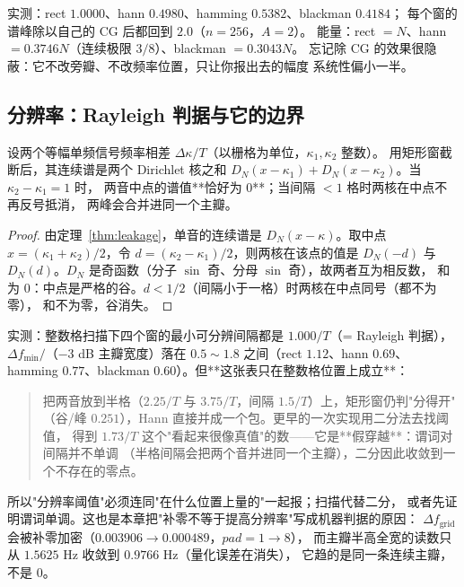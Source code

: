 实测：rect $1.0000$、hann $0.4980$、hamming $0.5382$、blackman $0.4184$；
每个窗的谱峰除以自己的 $\mathrm{CG}$ 后都回到 $2.0$（$n=256$，$A=2$）。
能量：rect $=N$、hann $=0.3746N$（连续极限 $3/8$）、blackman $=0.3043N$。
忘记除 $\mathrm{CG}$ 的效果很隐蔽：它不改旁瓣、不改频率位置，只让你报出去的幅度
系统性偏小一半。

\subsection{分辨率：Rayleigh 判据与它的边界}

\begin{theorem}
\label{thm:rayleigh}
设两个等幅单频信号频率相差 $\Delta\kappa/T$（以栅格为单位，$\kappa_1,\kappa_2$ 整数）。
用矩形窗截断后，其连续谱是两个 Dirichlet 核之和
$D_N(x-\kappa_1)+D_N(x-\kappa_2)$。当 $\kappa_2-\kappa_1=1$ 时，
两音中点的谱值**恰好为 $0$**；当间隔 $<1$ 格时两核在中点不再反号抵消，
两峰会合并进同一个主瓣。
\end{theorem}

\begin{proof}
由定理~\ref{thm:leakage}，单音的连续谱是 $D_N(x-\kappa)$。取中点
$x=(\kappa_1+\kappa_2)/2$，令 $d=(\kappa_2-\kappa_1)/2$，则两核在该点的值是
$D_N(-d)$ 与 $D_N(d)$。$D_N$ 是奇函数（分子 $\sin$ 奇、分母 $\sin$ 奇），故两者互为相反数，
和为 $0$：中点是严格的谷。$d<1/2$（间隔小于一格）时两核在中点同号（都不为零），
和不为零，谷消失。
\end{proof}

实测：整数格扫描下四个窗的最小可分辨间隔都是 $1.000/T$（= Rayleigh 判据），
$\Delta f_{\min}/$（$-3$ dB 主瓣宽度）落在 $0.5\sim1.8$ 之间（rect $1.12$、hann $0.69$、
hamming $0.77$、blackman $0.60$）。但**这张表只在整数格位置上成立**：

\begin{quote}
把两音放到半格（$2.25/T$ 与 $3.75/T$，间隔 $1.5/T$）上，矩形窗仍判"分得开"
（谷/峰 $0.251$），Hann 直接并成一个包。更早的一次实现用二分法去找阈值，
得到 $1.73/T$ 这个"看起来很像真值"的数——它是**假穿越**：谓词对间隔并不单调
（半格间隔会把两个音并进同一个主瓣），二分因此收敛到一个不存在的零点。
\end{quote}

所以"分辨率阈值"必须连同"在什么位置上量的"一起报；扫描代替二分，
或者先证明谓词单调。这也是本章把"补零不等于提高分辨率"写成机器判据的原因：
$\Delta f_{\text{grid}}$ 会被补零加密（$0.003906\to0.000489$，$pad=1\to8$），
而主瓣半高全宽的读数只从 $1.5625$ Hz 收敛到 $0.9766$ Hz（量化误差在消失），
它趋的是同一条连续主瓣，不是 $0$。

